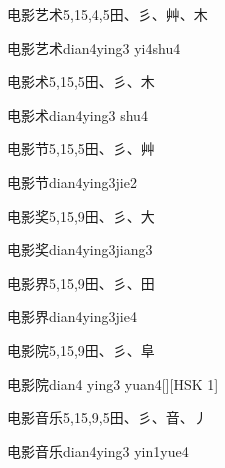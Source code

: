 \begin{Entry}{电影艺术}{5,15,4,5}{⽥、⼺、⾋、⽊}
  \begin{Phonetics}{电影艺术}{dian4ying3 yi4shu4}
  \end{Phonetics}
\end{Entry}

\begin{Entry}{电影术}{5,15,5}{⽥、⼺、⽊}
  \begin{Phonetics}{电影术}{dian4ying3 shu4}
  \end{Phonetics}
\end{Entry}

\begin{Entry}{电影节}{5,15,5}{⽥、⼺、⾋}
  \begin{Phonetics}{电影节}{dian4ying3jie2}
  \end{Phonetics}
\end{Entry}

\begin{Entry}{电影奖}{5,15,9}{⽥、⼺、⼤}
  \begin{Phonetics}{电影奖}{dian4ying3jiang3}
  \end{Phonetics}
\end{Entry}

\begin{Entry}{电影界}{5,15,9}{⽥、⼺、⽥}
  \begin{Phonetics}{电影界}{dian4ying3jie4}
  \end{Phonetics}
\end{Entry}

\begin{Entry}{电影院}{5,15,9}{⽥、⼺、⾩}
  \begin{Phonetics}{电影院}{dian4 ying3 yuan4}[][HSK 1]
  \end{Phonetics}
\end{Entry}

\begin{Entry}{电影音乐}{5,15,9,5}{⽥、⼺、⾳、⼃}
  \begin{Phonetics}{电影音乐}{dian4ying3 yin1yue4}
  \end{Phonetics}
\end{Entry}

